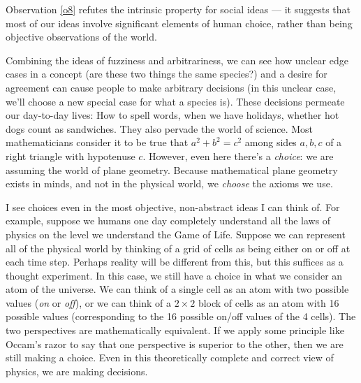 \documentclass[9pt, twoside]{book}
\theoremstyle{argtstyle}
\begin{document}
Observation \ref{o8} refutes the intrinsic property for social ideas --- it
suggests that most of our ideas involve significant elements of human choice,
rather than being objective observations of the world.


Combining the ideas of fuzziness and arbitrariness, we can see how unclear edge
cases in a concept (are these two things the same species?)
and a desire for agreement
can cause people to make arbitrary decisions
(in this unclear case, we'll choose a new special case for
what a species is).
These decisions permeate our day-to-day lives: How to spell words,
when we have holidays,
whether hot dogs count as sandwiches.
They also pervade the world of science.
Most mathematicians consider it to be true that $a^2+b^2=c^2$ among sides
$a,b,c$ of a right triangle with hypotenuse $c$. However, even here there's
a {\em choice}\/: we are assuming the world of plane geometry. Because
mathematical plane geometry exists in minds, and not in the physical world,
we {\em choose} the axioms we use.

I see choices
even in the most objective, non-abstract ideas I can think of.
For example, suppose we humans one day completely understand all
the laws of physics on the level we understand the Game of Life.
Suppose we can represent all of the physical world by thinking of a grid of
cells as being either on or off at each time step.
Perhaps reality will be
different from this, but this suffices as a thought experiment.
In this case, we still have a choice in what we consider an atom of the
universe. We can think of a single cell as an atom with two possible values
({\em on} or {\em off}\/), or we can think of a $2\times 2$
block of cells as an atom with 16 possible values (corresponding to the 16
possible on/off values of the 4 cells). The two perspectives are mathematically
equivalent. If we apply some principle like Occam's razor to say
that one perspective is superior
to the other, then we are still making a choice. Even in this theoretically
complete and correct view of physics, we are making decisions.
\end{document}
